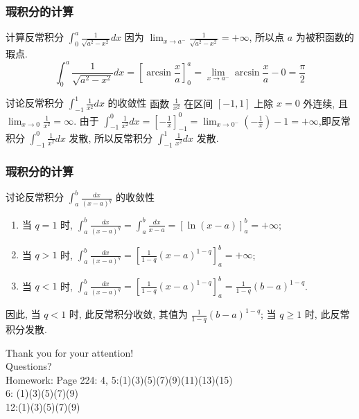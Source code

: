 \documentclass[
10pt,
aspectratio=43,
]{beamer}
\begin{document}
\begin{frame}
	\frametitle{瑕积分的计算}
	\everymath{\displaystyle}
	\begin{block}{计算反常积分 $\int_0^a \frac{1}{\sqrt{a^2-x^2}} d x$}
		因为 $\lim _{x \rightarrow a^{-}} \frac{1}{\sqrt{a^2-x^2}}=+\infty$, 所以点 $a$ 为被积函数的瑕点.
		$$
			\int_0^a \frac{1}{\sqrt{a^2-x^2}} d x=\left[\arcsin \frac{x}{a}\right]_0^a=\lim _{x \rightarrow a^{-}} \arcsin \frac{x}{a}-0=\frac{\pi}{2}
		$$
	\end{block}
	\begin{block}{讨论反常积分 $\int_{-1}^1 \frac{1}{x^2} d x$ 的收敛性}
		函数 $\frac{1}{x^2}$ 在区间 $[-1,1]$ 上除 $x=0$ 外连续, 且 $\lim _{x \rightarrow 0} \frac{1}{x^2}=\infty$.
		由于 $\int_{-1}^0 \frac{1}{x^2} d x=\left[-\frac{1}{x}\right]_{-1}^0=\lim _{x \rightarrow 0^{-}}\left(-\frac{1}{x}\right)-1=+\infty$,即反常积分 $\int_{-1}^0 \frac{1}{x^2} d x$ 发散, 所以反常积分 $\int_{-1}^1 \frac{1}{x^2} d x$ 发散.
	\end{block}
\end{frame}

\begin{frame}
	\frametitle{瑕积分的计算}
	\everymath{\displaystyle}
	\begin{block}{讨论反常积分 $\int_a^b \frac{d x}{(x-a)^q}$ 的收敛性}
		\begin{enumerate}
			\item 当 $q=1$ 时, $\int_a^b \frac{d x}{(x-a)^q}=\int_a^b \frac{d x}{x-a}=[\ln (x-a)]_a^b=+\infty$;
			\item 当 $q>1$ 时, $\int_a^b \frac{d x}{(x-a)^q}=\left[\frac{1}{1-q}(x-a)^{1-q}\right]_a^b=+\infty$;
			\item 当 $q<1$ 时, $\int_a^b \frac{d x}{(x-a)^q}=\left[\frac{1}{1-q}(x-a)^{1-q}\right]_a^b=\frac{1}{1-q}(b-a)^{1-q}$.
		\end{enumerate}
		因此, 当 $q<1$ 时, 此反常积分收敛, 其值为 $\frac{1}{1-q}(b-a)^{1-q}$; 当 $q \geq 1$ 时, 此反常积分发散.
	\end{block}
\end{frame}

\begin{frame}[plain]
	\vfill
	\centering
	{
		\centering \Huge \color{white} Thank you for your attention!\\[10pt]Questions?\\[10pt]Homework: Page 224: 4, 5:(1)(3)(5)(7)(9)(11)(13)(15)\\
		6: (1)(3)(5)(7)(9)\\
		12:(1)(3)(5)(7)(9)
	}
	\vfill
\end{frame}
\end{document}
